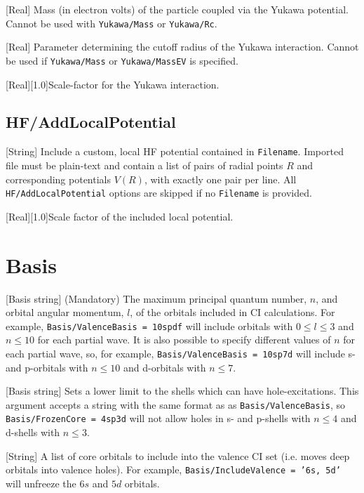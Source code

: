 \documentclass{report}
\begin{document}
[Real]{%
Mass (in electron volts) of the particle coupled via the Yukawa potential. Cannot be used with
\texttt{Yukawa/Mass} or \texttt{Yukawa/Rc}.%
}

[Real]{%
Parameter determining the cutoff radius of the Yukawa interaction. Cannot be used if \texttt{Yukawa/Mass} or \texttt{Yukawa/MassEV} is specified.%
}

[Real][1.0]{Scale-factor for the Yukawa interaction.}

\subsection{HF/AddLocalPotential}

[String]{%
Include a custom, local HF potential contained in \texttt{Filename}. Imported file must be plain-text
and contain a list of pairs of radial points $R$ and corresponding potentials $V(R)$, with exactly one
pair per line. All \texttt{HF/AddLocalPotential} options are skipped if no \texttt{Filename} is provided.%
}

[Real][1.0]{Scale factor of the included local potential.}

\section{Basis}

[Basis string]{%
(Mandatory) The maximum principal quantum number, $n$, and orbital angular momentum, $l$, of
the orbitals included in CI calculations. For example,
\texttt{Basis/ValenceBasis = 10spdf} will include orbitals with $0 \leq l \leq 3$ and $n \leq 10$ for
each partial wave. It is also possible to specify different values of $n$ for each partial wave, so, for
example, \texttt{Basis/ValenceBasis = 10sp7d} will include s- and p-orbitals with $n \leq 10$ and
d-orbitals with $n \leq 7$.%
}

[Basis string]{%
Sets a lower limit to the shells which can have hole-excitations. This argument accepts a string with
the same format as as \texttt{Basis/ValenceBasis}, so \texttt{Basis/FrozenCore = 4sp3d} will not allow
holes in s- and p-shells with $n \leq 4$ and d-shells with $n \leq 3$.%
}

[String]{%
A list of core orbitals to include into the valence CI set (i.e. moves deep orbitals into valence holes). For example, \texttt{Basis/IncludeValence = '6s, 5d'} will unfreeze the $6s$ and $5d$ orbitals.%
}
\end{document}
